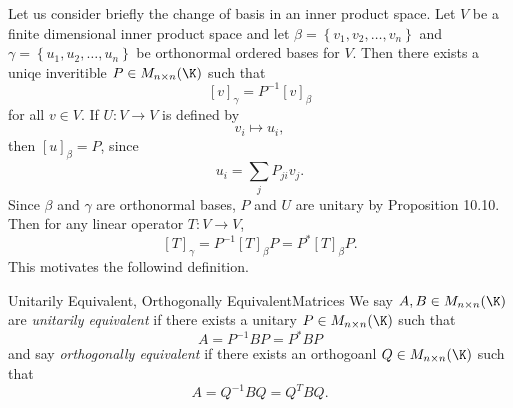 \documentclass[linearalgebra]{subfiles}
\begin{document}
    \begin{remark}
        Let us consider briefly the change of basis in an inner product space. Let $V$ be a finite dimensional inner product space and let $\beta = \left\lbrace v_1,v_2,\ldots,v_n \right\rbrace$ and $\gamma=\left\lbrace u_1,u_2,\ldots,u_n \right\rbrace$ be orthonormal ordered bases for $V$. Then there exists a uniqe inveritible $P\in M_{n\times n}(\K)$ such that
        \begin{equation*}
            \left[ v \right] _\gamma = P^{-1}\left[ v \right] _\beta
        \end{equation*}
        for all $v\in V$. If $U:V\to V$ is defined by
        \begin{equation*}
            v_i\mapsto u_i,
        \end{equation*}
        then $\left[ u \right] _\beta = P$, since
        \begin{equation*}
            u_i = \sum^{}_{j} P_{ji}v_j.
        \end{equation*}
        Since $\beta$ and $\gamma$ are orthonormal bases, $P$ and $U$ are unitary by Proposition 10.10. Then for any linear operator $T:V\to V$,
        \begin{equation*}
            \left[ T \right] _\gamma = P^{-1}\left[ T \right] _\beta P = P^*\left[ T \right] _\beta P.
        \end{equation*}
        This motivates the followind definition.
    \end{remark}

    \begin{definition}{Unitarily Equivalent, Orthogonally Equivalent}{Matrices}
        We say $A,B\in M_{n\times n}(\K)$ are \emph{unitarily equivalent} if there exists a unitary $P\in M_{n\times n}(\K)$ such that
        \begin{equation*}
            A = P^{-1}BP = P^*BP
        \end{equation*}
        and say \emph{orthogonally equivalent} if there exists an orthogoanl $Q\in M_{n\times n}(\K)$ such that
        \begin{equation*}
            A = Q^{-1}BQ = Q^TBQ.
        \end{equation*}
    \end{definition}

    
\end{document}

